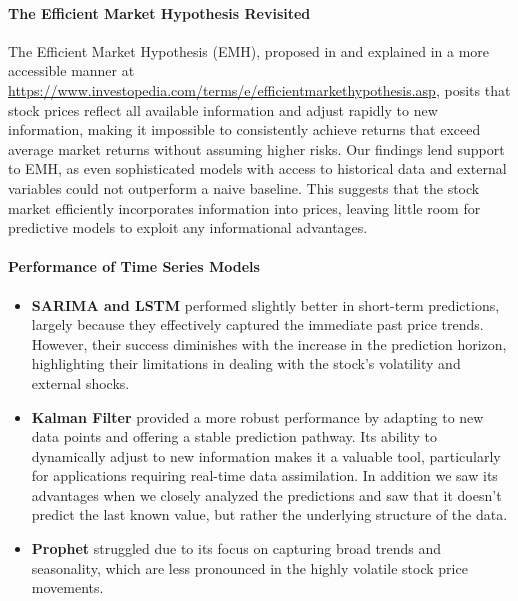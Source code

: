 \documentclass[12pt]{article}
\theoremstyle{definition}
\begin{document}
\paragraph{The Efficient Market Hypothesis Revisited}
The Efficient Market Hypothesis (EMH), proposed in \cite{fama1970efficient} and explained in 
a more accessible manner at \url{https://www.investopedia.com/terms/e/efficientmarkethypothesis.asp},
posits that stock prices reflect all available information and adjust rapidly to new information, making it impossible to consistently achieve returns that exceed average market returns without assuming higher risks. Our findings lend support to EMH, as even sophisticated models with access to historical data and external variables could not outperform a naive baseline. This suggests that the stock market efficiently incorporates information into prices, leaving little room for predictive models to exploit any informational advantages.

\paragraph{Performance of Time Series Models}
\begin{itemize}
    \item \textbf{SARIMA and LSTM} performed slightly better in short-term predictions, largely because they effectively captured the immediate past price trends. However, their success diminishes with the increase in the prediction horizon, highlighting their limitations in dealing with the stock's volatility and external shocks.
    \item \textbf{Kalman Filter} provided a more robust performance by adapting to new data points and offering a stable prediction pathway. Its ability to dynamically adjust to new information makes it a valuable tool, particularly for applications requiring real-time data assimilation. In addition we saw its advantages when we closely analyzed the predictions and saw that it doesn't predict the last known value, but rather the underlying structure of the data.
    \item \textbf{Prophet} struggled due to its focus on capturing broad trends and seasonality, which are less pronounced in the highly volatile stock price movements.
\end{itemize}
\end{document}
